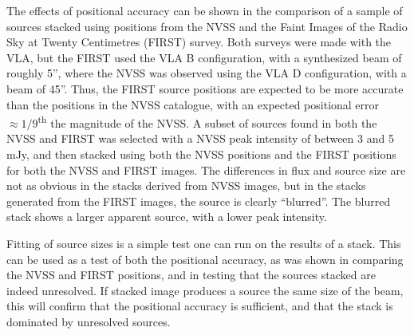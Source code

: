 \documentclass{article}
\begin{document}
The effects of positional accuracy can be shown in the comparison of a sample of
sources stacked using positions from the NVSS and the Faint Images of the Radio
Sky at Twenty Centimetres (FIRST) survey.  Both surveys were made with the VLA, 
but the FIRST used the VLA B configuration, with a synthesized beam of roughly 
5'', where the NVSS was observed using the VLA D configuration, with a beam of 
45''.  Thus, the FIRST source positions are expected to be more accurate than 
the positions in the NVSS catalogue, with an expected positional error 
$\approx1/9$\textsuperscript{th} the magnitude of the NVSS.  A subset of sources
found in both the NVSS and FIRST was selected with a NVSS peak intensity of 
between 3 and 5 mJy, and then stacked using both the NVSS positions and the 
FIRST positions for both the NVSS and FIRST images. The differences in flux and source size are not as obvious in the stacks derived from NVSS images, but in 
the stacks generated from the FIRST images, the source is clearly ``blurred''. 
The blurred stack shows a larger apparent source, with a lower peak intensity. 

Fitting of source sizes is a simple test one can run on the results of a stack.
This can be used as a test of both the positional accuracy, as was shown in 
comparing the NVSS and FIRST positions, and in testing that the sources stacked
are indeed unresolved.  If stacked image produces a source the same size of the
beam, this will confirm that the positional accuracy is sufficient, and that
the stack is dominated by unresolved sources.
\end{document}

